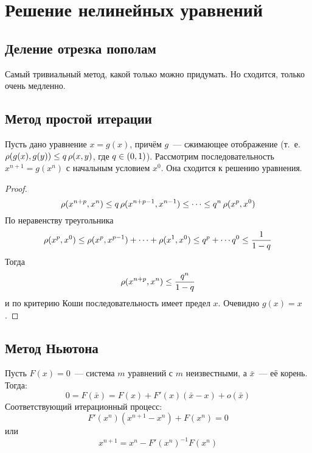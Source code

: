 \section{Решение нелинейных уравнений}

\subsection{Деление отрезка пополам}
Самый тривиальный метод, какой только можно придумать. Но сходится, только очень медленно.

\subsection{Метод простой итерации}
Пусть дано уравнение $x = g(x)$, причём $g$ — сжимающее отображение (т. е. $\operatorname{\rho}(g(x), g(y)) \leq q\operatorname{\rho}(x, y)$, где $q \in \intoo{0, 1}$). Рассмотрим последовательность $x^{n+1} = g(x^n)$ с начальным условием $x^0$. Она сходится к решению уравнения.
\begin{proof}
	\[ \operatorname{\rho}(x^{n+p}, x^n) \leq q \operatorname{\rho}(x^{n+p-1}, x^{n-1}) \leq \dotsb \leq q^n \operatorname{\rho}(x^p, x^0) \]
	По неравенству треугольника
	\[ \operatorname{\rho}(x^p, x^0) \leq \operatorname{\rho}(x^p, x^{p-1}) + \dotsb + \operatorname{\rho}(x^1, x^0) \leq q^p + \dotsb q^0 \leq \frac{1}{1 - q} \]
	Тогда
	\[ \operatorname{\rho}(x^{n+p}, x^n) \leq \frac{q^n}{1 - q} \]
	и по критерию Коши последовательность имеет предел $x$. Очевидно $g(x) = x$.
\end{proof}

\subsection{Метод Ньютона}
Пусть $F(x) = 0$ — система $m$ уравнений с $m$ неизвестными, а $\bar x$ — её корень. Тогда:
\[ 0 = F(\bar x) = F(x) + F'(x) (\bar x - x) + o(\bar x) \]
Соответствующий итерационный процесс:
\[ F'(x^n)(x^{n+1} - x^n) + F(x^n) = 0 \]
или
\[ x^{n+1} = x^n - F'(x^n)^{-1} F(x^n) \]

